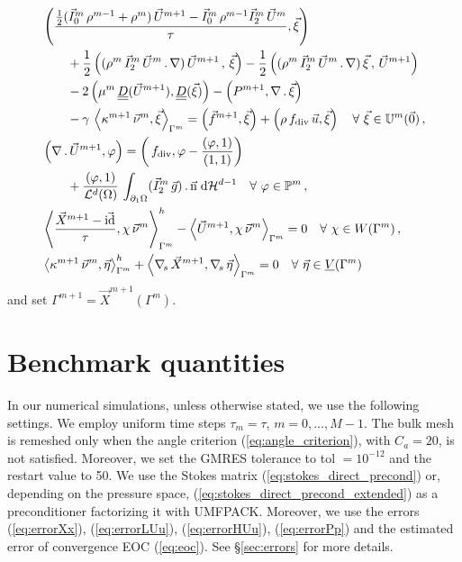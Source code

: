 \begin{subequations}
\begin{align}
& \left(\frac{\tfrac{1}{2}(\vec I^m_0\,\rho^{m-1}+\rho^m)\,\vec U^{m+1} -
\vec I^m_0\,\rho^{m-1} \vec I^m_2\,\vec U^m}{\tau}, \vec \xi \right)\nonumber \\
& \qquad + \frac{1}{2}\left((\rho^m\,\vec I^m_2\,\vec U^m\,.\,\nabla)\,
\vec U^{m+1}\,,\,\vec \xi \right) - \frac{1}{2} \left((\rho^m\,
\vec I^m_2 \, \vec U^m\,.\,\nabla)\,\vec \xi\,,\,\vec U^{m+1} \right)
\nonumber \\
& \qquad - 2\left(\mu^m\,\mat D(\vec U^{m+1}), \mat D(\vec \xi) \right)
- \left(P^{m+1}, \nabla\,.\,\vec \xi\right) \nonumber \\
& \qquad - \gamma\,\left\langle
\kappa^{m+1}\,\vec\nu^m,\vec\xi\right\rangle_{\Gamma^m}
= \left(\vec f^{m+1}, \vec \xi\right)
+\left(\rho\,f_{\rm{div}}\,\vec u,\vec\xi\right) \quad \forall\ \vec\xi \in
\uspacedisc{0}{m}\,,\\
& \left(\nabla\,.\,\vec U^{m+1}, \varphi\right)  = \left(\,f_{\rm{div}},
\varphi-\frac{\left(\varphi,1\right)}{\left(1,1\right)}\right) \nonumber \\
& \qquad +\frac{\left(\varphi, 1\right)}{\vol(\Omega)}\, \int_{\partial_1\Omega}
(\vec I^m_2\,\vec g) \,.\, \unitn \dH{d-1}
\quad \forall\ \varphi \in \pspace^m\,, \\
&  \left\langle \frac{\vec X^{m+1} - \vec\id}{\tau} ,\chi\,\vec\nu^m
\right\rangle_{\Gamma^m}^h - \left\langle \vec U^{m+1}, \chi\,\vec\nu^m
\right\rangle_{\Gamma^m}  = 0 \quad \forall\ \chi \in \Wh\,,\\
& \left\langle \kappa^{m+1}\,\vec\nu^m, \vec\eta \right\rangle_{\Gamma^m}^h
+ \left\langle \nabs\,\vec X^{m+1}, \nabs\,\vec \eta \right\rangle_{\Gamma^m} =
0 \quad \forall\ \vec\eta \in \Vh
\end{align}
\end{subequations}
and set $\Gamma^{m+1} = \vec X^{m+1}(\Gamma^m)$.

\section{Benchmark quantities}\label{sec:benchmark_quantities}
In our numerical simulations, unless otherwise stated, we use the following
settings. We employ uniform time steps $\tau_m=\tau$, $m=0,\ldots, M-1$. The
bulk mesh is remeshed only when the angle criterion (\ref{eq:angle_criterion}),
with $C_a=20$\textdegree, is not satisfied. Moreover, we set the GMRES
tolerance to tol $=10^{-12}$ and the restart value to 50. We use the Stokes
matrix (\ref{eq:stokes_direct_precond}) or, depending on the pressure space,
(\ref{eq:stokes_direct_precond_extended}) as a preconditioner factorizing it
with UMFPACK. Moreover, we use the errors (\ref{eq:errorXx}),
(\ref{eq:errorLUu}), (\ref{eq:errorHUu}), (\ref{eq:errorPp}) and the estimated
error of convergence EOC (\ref{eq:eoc}). See \S\ref{sec:errors} for more
details.

